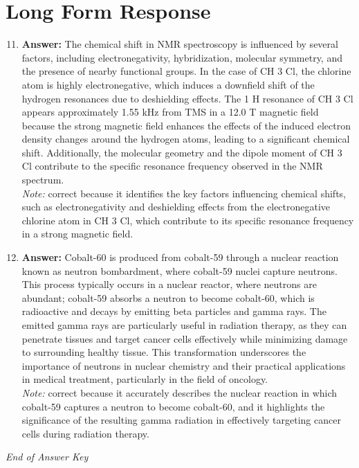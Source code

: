 \documentclass[12pt]{article}
\begin{document}
\section*{Long Form Response}
\begin{enumerate}[label=\arabic*.]
\setcounter{enumi}{10}
\item \textbf{Answer:} The chemical shift in NMR spectroscopy is influenced by several factors, including electronegativity, hybridization, molecular symmetry, and the presence of nearby functional groups. In the case of CH 3 Cl, the chlorine atom is highly electronegative, which induces a downfield shift of the hydrogen resonances due to deshielding effects. The 1 H resonance of CH 3 Cl appears approximately 1.55 kHz from TMS in a 12.0 T magnetic field because the strong magnetic field enhances the effects of the induced electron density changes around the hydrogen atoms, leading to a significant chemical shift. Additionally, the molecular geometry and the dipole moment of CH 3 Cl contribute to the specific resonance frequency observed in the NMR spectrum.
\\ \textit{Note:} correct because it identifies the key factors influencing chemical shifts, such as electronegativity and deshielding effects from the electronegative chlorine atom in CH 3 Cl, which contribute to its specific resonance frequency in a strong magnetic field.
\item \textbf{Answer:} Cobalt-60 is produced from cobalt-59 through a nuclear reaction known as neutron bombardment, where cobalt-59 nuclei capture neutrons. This process typically occurs in a nuclear reactor, where neutrons are abundant; cobalt-59 absorbs a neutron to become cobalt-60, which is radioactive and decays by emitting beta particles and gamma rays. The emitted gamma rays are particularly useful in radiation therapy, as they can penetrate tissues and target cancer cells effectively while minimizing damage to surrounding healthy tissue. This transformation underscores the importance of neutrons in nuclear chemistry and their practical applications in medical treatment, particularly in the field of oncology.
\\ \textit{Note:} correct because it accurately describes the nuclear reaction in which cobalt-59 captures a neutron to become cobalt-60, and it highlights the significance of the resulting gamma radiation in effectively targeting cancer cells during radiation therapy.
\end{enumerate}

\vfill
\noindent\textit{End of Answer Key}
\end{document}
